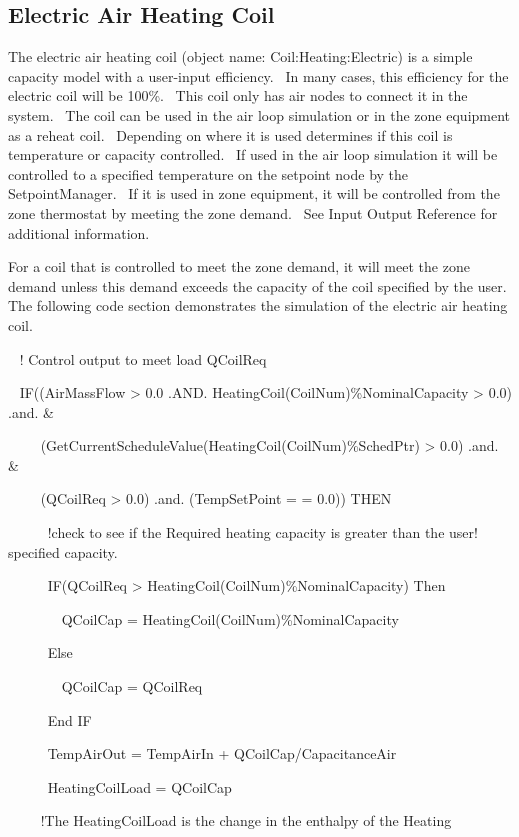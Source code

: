 \subsection{Electric Air Heating Coil}\label{electric-air-heating-coil}

The electric air heating coil (object name: Coil:Heating:Electric) is a simple capacity model with a user-input efficiency.~ In many cases, this efficiency for the electric coil will be 100\%.~ This coil only has air nodes to connect it in the system.~ The coil can be used in the air loop simulation or in the zone equipment as a reheat coil.~ Depending on where it is used determines if this coil is temperature or capacity controlled.~ If used in the air loop simulation it will be controlled to a specified temperature on the setpoint node by the SetpointManager.~ If it is used in zone equipment, it will be controlled from the zone thermostat by meeting the zone demand.~ See Input Output Reference for additional information.

For a coil that is controlled to meet the zone demand, it will meet the zone demand unless this demand exceeds the capacity of the coil specified by the user.  The following code section demonstrates the simulation of the electric air heating coil.

~ ! Control output to meet load QCoilReq

~ IF((AirMassFlow \textgreater{} 0.0 .AND. HeatingCoil(CoilNum)\%NominalCapacity \textgreater{} 0.0) .and. \&

~~~~ (GetCurrentScheduleValue(HeatingCoil(CoilNum)\%SchedPtr) \textgreater{} 0.0) .and. \&

~~~~ (QCoilReq \textgreater{} 0.0) .and. (TempSetPoint = = 0.0)) THEN

~ ~~~~!check to see if the Required heating capacity is greater than the user! specified capacity.

~~~~~ IF(QCoilReq \textgreater{} HeatingCoil(CoilNum)\%NominalCapacity) Then

~~~~~~~ QCoilCap = HeatingCoil(CoilNum)\%NominalCapacity

~~~~~ Else

~~~~~~~ QCoilCap = QCoilReq

~~~~~ End IF

~~~~~ TempAirOut = TempAirIn + QCoilCap/CapacitanceAir

~~~~~ HeatingCoilLoad = QCoilCap

~~~~ !The HeatingCoilLoad is the change in the enthalpy of the Heating

